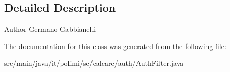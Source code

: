 \subsection{Detailed Description}
\begin{DoxyAuthor}{Author}
Germano Gabbianelli 
\end{DoxyAuthor}


The documentation for this class was generated from the following file\+:\begin{DoxyCompactItemize}
\item 
src/main/java/it/polimi/se/calcare/auth/Auth\+Filter.\+java\end{DoxyCompactItemize}
